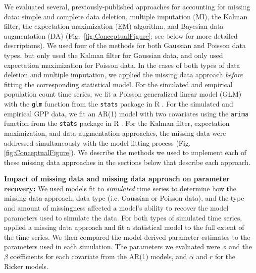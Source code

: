 \documentclass{article}
\begin{document}
We evaluated several, previously-published approaches for accounting for missing data: simple and complete data deletion, multiple imputation (MI), the Kalman filter, the expectation maximization (EM) algorithm, and Bayesian data augmentation (DA) (Fig.\ \ref{fig:ConceptualFigure}; see below for more detailed descriptions). We used four of the methods for both Gaussian and Poisson data types, but only used the Kalman filter for Gaussian data, and only used expectation maximization for Poisson data. %
In the cases of both types of data deletion and multiple imputation, we applied the missing data approach \textit{before} fitting the corresponding statistical model. For the simulated and empirical population count time series, we fit a Poisson generalized linear model (GLM) with the \texttt{glm} function from the \texttt{stats} package in R \citep{r_2021}. For the simulated and empirical GPP data, we fit an AR(1) model with two covariates using the \texttt{arima} function from the \texttt{stats} package in R \citep{r_2021}. For the Kalman filter, expectation maximization, and data augmentation approaches, the missing data were addressed simultaneously with the model fitting process (Fig. \ref{fig:ConceptualFigure}). We describe the methods we used to implement each of these missing data approaches in the sections below that describe each approach.  

\noindent\textbf{Impact of missing data and missing data approach on parameter recovery:} We used models fit to \textit{simulated} time series to determine how the missing data approach, data type (i.e. Gaussian or Poisson data), and the type and amount of missingness affected a model's ability to recover the model parameters used to simulate the data. For both types of simulated time series, applied a missing data approach and fit a statistical model to the full extent of the time series. We then compared the model-derived parameter estimates to the parameters used in each simulation. The parameters we evaluated were $\phi$ and the $\beta$ coefficients for each covariate from the AR(1) models, and $\alpha$ and $r$ for the Ricker models.
\end{document}
